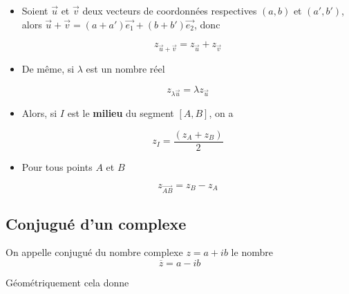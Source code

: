 \documentclass[french]{book}
\newcommand{\ve}[1]{\overrightarrow{#1}}
\newcommand{\la}{\lambda}
\newcommand{\ud}[1]{\dfrac{#1}{2}}
\newcommand{\cacheg}[1]{#1}
\begin{document}
\begin{itemize}

\item[$\bullet$]  Soient   $\ve{u}$  et  $\ve{v}$  deux   vecteurs  de  coordonnées
  respectives         $(a,b)$         et        $(a',b')$,         alors
  $\ve{u}+\ve{v}=(a+a')\ve{e_1}+(b+b')\ve{e_2}$, donc 

  
    \begin{prop}
      \[z_{\ve{u}+\ve{v}}=z_{\ve{u}}+z_{\ve{v}}\]
      \end{prop}
    




\item[$\bullet$] De même, si $\la$ est un nombre réel 

  
    \begin{prop}
      \[z_{\la \ve{u}}=\la z_{\ve{u}}\]
      \end{prop}
    


\item[$\bullet$] Alors, si  $I$ est le \textbf{milieu} du segment $[A,B]$, on a


  
    \begin{prop}
      \[z_I=\ud{(z_A+z_B)}\]
      \end{prop}
    




\item[$\bullet$] Pour tous points $A$ et $B$ 

  
    \begin{prop}
      \[z_{\ve{AB}}=z_B-z_A\]
     \end{prop}
    

\end{itemize}


\subsection{Conjugué d'un complexe}

  \begin{defn}[Conjugué]
    On appelle conjugué du nombre complexe $z=a+ib$ le nombre $$\cacheg{\overline{z}=a-ib}$$
    \end{defn}
  



Géométriquement cela donne 
\end{document}
